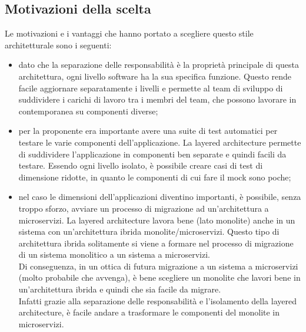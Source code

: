 \subsection{Motivazioni della scelta}
Le motivazioni e i vantaggi che hanno portato a scegliere questo stile architetturale sono i seguenti:
\begin{itemize}
    \item dato che la separazione delle responsabilità è la proprietà principale di questa architettura,
        ogni livello software ha la sua specifica funzione. Questo rende facile aggiornare 
        separatamente i livelli e permette al team di sviluppo di suddividere i carichi di lavoro tra i 
        membri del team, che possono lavorare in contemporanea su componenti diverse;
    \item per la proponente era importante avere una suite di test automatici per testare le varie componenti
        dell'applicazione. La layered architecture
        permette di suddividere l'applicazione in componenti ben separate e quindi facili da testare.
        Essendo ogni livello isolato, è possibile creare casi di test di dimensione ridotte, 
        in quanto le componenti di cui fare il \gls{mock} sono poche;
    \item nel caso le dimensioni dell'applicazioni diventino importanti, è possibile, senza troppo sforzo, avviare un processo
        di migrazione ad un'architettura a microservizi. La layered architecture lavora bene (lato monolite) anche
        in un sistema con un'architettura ibrida monolite/microservizi. Questo tipo di architettura
        ibrida solitamente si viene a formare nel processo di migrazione di un sistema monolitico a un sistema a microservizi.
        \\
        Di conseguenza, in un ottica di futura migrazione a un sistema a microservizi (molto probabile che avvenga), è
        bene scegliere un monolite che lavori bene in un'architettura ibrida e quindi che sia facile da migrare.
        \\
        Infatti grazie alla separazione delle responsabilità e l'isolamento della layered architecture, è facile andare
        a trasformare le componenti del monolite in microservizi.
\end{itemize}
\clearpage
